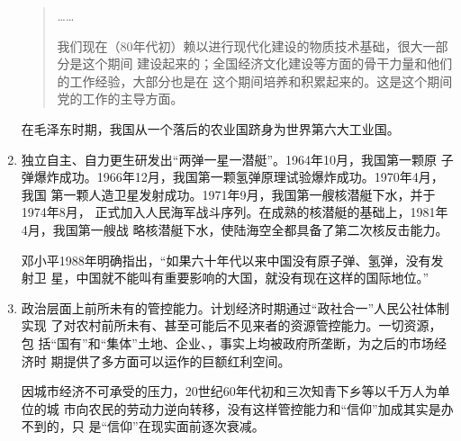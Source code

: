 \begin{enumerate}
\begin{quotation}
    ……

    我们现在（80年代初）赖以进行现代化建设的物质技术基础，很大一部分是这个期间
    建设起来的；全国经济文化建设等方面的骨干力量和他们的工作经验，大部分也是在
    这个期间培养和积累起来的。这是这个期间党的工作的主导方面。
  \end{quotation}
  在毛泽东时期，我国从一个落后的农业国跻身为世界第六大工业国。

\item 独立自主、自力更生研发出“两弹一星一潜艇”。1964年10月，我国第一颗原
  子弹爆炸成功。1966年12月，我国第一颗氢弹原理试验爆炸成功。1970年4月，我国
  第一颗人造卫星发射成功。1971年9月，我国第一艘核潜艇下水，并于1974年8月，
  正式加入人民海军战斗序列。在成熟的核潜艇的基础上，1981年4月，我国第一艘战
  略核潜艇下水，使陆海空全都具备了第二次核反击能力。

  邓小平1988年明确指出，“如果六十年代以来中国没有原子弹、氢弹，没有发射卫
  星，中国就不能叫有重要影响的大国，就没有现在这样的国际地位。”



\item 政治层面上前所未有的管控能力。计划经济时期通过“政社合一”人民公社体制实现
  了对农村前所未有、甚至可能后不见来者的资源管控能力。一切资源，包
  括“国有”和“集体”土地、企业、，事实上均被政府所垄断，为之后的市场经济时
  期提供了多方面可以运作的巨额红利空间。

  因城市经济不可承受的压力，20世纪60年代初和三次知青下乡等以千万人为单位的城
  市向农民的劳动力逆向转移，没有这样管控能力和“信仰”加成其实是办不到的，只
  是“信仰”在现实面前逐次衰减。
\end{enumerate}

